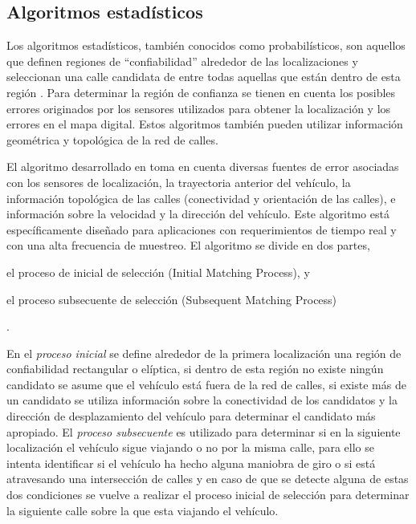 \subsection{Algoritmos estadísticos}

Los algoritmos estadísticos, también conocidos como probabilísticos, son aquellos que definen regiones de “confiabilidad” alrededor de las localizaciones y seleccionan una calle candidata de entre todas aquellas que están dentro de esta región \cite{quddus2007current}. Para determinar la región de confianza se tienen en cuenta los posibles errores originados por los sensores utilizados para obtener la localización y los errores en el mapa digital. Estos algoritmos también pueden utilizar información geométrica y topológica de la red de calles.

El algoritmo desarrollado en \cite{ochieng2009map} toma en cuenta diversas fuentes de error asociadas con los sensores de localización, la trayectoria anterior del vehículo, la información topológica de las calles (conectividad y orientación de las calles), e información sobre la velocidad y la dirección del vehículo. Este algoritmo está específicamente diseñado para aplicaciones con requerimientos de tiempo real y con una alta frecuencia de muestreo. El algoritmo se divide en dos partes, \begin{enumerate*}[a)]
\item el proceso de inicial de selección (Initial Matching Process), y \item el proceso subsecuente de selección (Subsequent Matching Process)\end{enumerate*}. 

En el \emph{proceso inicial} se define alrededor de la primera localización una región de confiabilidad rectangular o elíptica, si dentro de esta región no existe ningún candidato se asume que el vehículo está fuera de la red de calles, si existe más de un candidato se utiliza información sobre la conectividad de los candidatos y la dirección de desplazamiento del vehículo para determinar el candidato más apropiado. El \emph{proceso subsecuente} es utilizado para determinar si en la siguiente localización el vehículo sigue viajando o no por la misma calle, para ello se intenta identificar si el vehículo ha hecho alguna maniobra de giro o si está atravesando una intersección de calles y en caso de que se detecte alguna de estas dos condiciones se vuelve a realizar el proceso inicial de selección para determinar la siguiente calle sobre la que esta viajando el vehículo.

